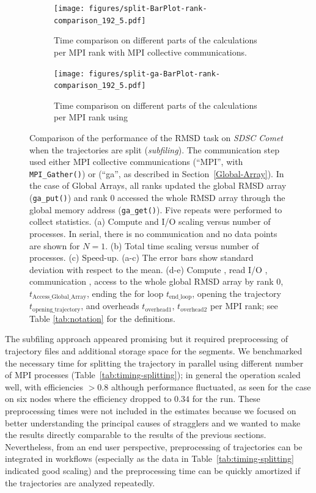 \begin{figure}[!htb]
  \begin{subfigure} {.45\textwidth}
    \texttt{[image: figures/split-BarPlot-rank-comparison\_192\_5.pdf]}
    \captionsetup{format=hang}
    \caption{Time comparison on different parts of the calculations per MPI rank with MPI collective communications.}
    \label{fig:MPIranks-split}
  \end{subfigure}
  \hfill
  \begin{subfigure} {.5\textwidth}
    \texttt{[image: figures/split-ga-BarPlot-rank-comparison\_192\_5.pdf]}
    \captionsetup{format=hang}
    \caption{Time comparison on different parts of the calculations per MPI rank using }
    \label{fig:MPIranks-split-ga}
\end{subfigure}
\caption{Comparison of the performance of the RMSD task on \emph{SDSC Comet} when the trajectories are split (\emph{subfiling}).
  The communication step used either MPI collective communications (``MPI'', with \texttt{MPI\_Gather()}) or   (``ga'', as described in Section~\protect\ref{Global-Array}).
  In the case of Global Arrays, all ranks updated the global RMSD array (\texttt{ga\_put()}) and rank 0 accessed the whole RMSD array through the global memory address (\texttt{ga\_get()}).
  Five repeats were performed to collect statistics.
  (a) Compute and I/O scaling versus number of processes.
  In serial, there is no communication and no data points are shown for $N=1$.
  (b) Total time scaling versus number of processes.
  (c) Speed-up.
  (a-c) The error bars show standard deviation with respect to the mean.
  (d-e) Compute \tcomp, read I/O \tIO, communication \tcomm, access to the whole global RMSD array by rank 0, $t_{\text{Access\_Global\_Array}}$, ending the for loop $t_{\text{end\_loop}}$, opening the trajectory $t_{\text{opening\_trajectory}}$, and overheads $t_{\text{overhead1}}$, $t_{\text{overhead2}}$ per MPI rank; see Table \ref{tab:notation} for the definitions.
}
\label{fig:MPIwithIO-split}
\end{figure}


The subfiling approach appeared promising but it required preprocessing of trajectory files and additional storage space for the segments.
We benchmarked the necessary time for splitting the trajectory in parallel using different number of MPI processes (Table~\ref{tab:timing-splitting}); in general the operation scaled well, with efficiencies $> 0.8$ although performance fluctuated, as seen for the case on six nodes where the efficiency dropped to $0.34$ for the run.
These preprocessing times were not included in the estimates because we focused on better understanding the principal causes of stragglers and we wanted to make the results directly comparable to the results of the previous sections.
Nevertheless, from an end user perspective, preprocessing of trajectories can be integrated in workflows (especially as the data in Table~\ref{tab:timing-splitting} indicated good scaling) and the preprocessing time can be quickly amortized if the trajectories are analyzed repeatedly.

